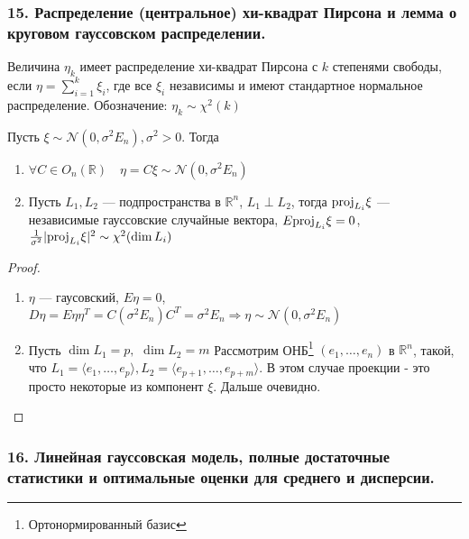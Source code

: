 \documentclass[12pt, russian]{article}
\begin{document}
\newpage
\subsubsection*{15. Распределение (центральное) хи-квадрат Пирсона и лемма о круговом гауссовском распределении.}

\begin{mydef}
Величина $\eta_k$ имеет распределение хи-квадрат Пирсона с $k$ степенями свободы, если $\eta = \sum\limits_{i=1}^k{\xi_i}$, где все $\xi_i$ независимы и имеют стандартное нормальное распределение.
Обозначение: $\eta_k \sim \chi^2(k) $
\end{mydef}

\begin{lemma}
Пусть $\xi \sim \mathcal{N}(0, \sigma^2E_n), \sigma^2 > 0$. Тогда 
\begin{enumerate}
\item $\forall C\in O_n(\mathbb{R}) \quad \eta=C\xi\sim\mathcal{N}(0, \sigma^2E_n)$
\item Пусть $L_1, L_2$ --- подпространства в $\mathbb{R}^n$, $L_1 \perp L_2$, тогда $\text{proj}_{L_i}{\xi}$ --- независимые гауссовские случайные вектора, $E\text{proj}_{L_i}{\xi} = 0$, $\frac{1}{\sigma^2}|\text{proj}_{L_i}{\xi}|^2 \sim \chi^2(\dim{L_i})$
\end{enumerate}
\begin{proof}
$ $
\begin{enumerate}
\item $\eta$ --- гаусовский, $E\eta = 0$, $D\eta = E\eta\eta^T = C(\sigma^2E_n)C^T = \sigma^2E_n \Longrightarrow \eta\sim\mathcal{N}(0, \sigma^2E_n)$
\item Пусть $\dim L_1 = p,\,\,\dim L_2 = m$ 
Рассмотрим ОНБ\footnote{Ортонормированный базис} $(e_1,\ldots,e_n)$ в $\mathbb{R}^n$, такой, что $L_1 = \langle e_1,\ldots,e_p\rangle, L_2 = \langle e_{p+1},\ldots,e_{p+m}\rangle$. В этом случае проекции - это просто некоторые из компонент $\xi$. Дальше очевидно.
\end{enumerate}
\end{proof}

\end{lemma}

\newpage
\subsubsection*{16. Линейная гауссовская модель, полные достаточные статистики и оптимальные оценки для среднего и дисперсии.}
\end{document}
